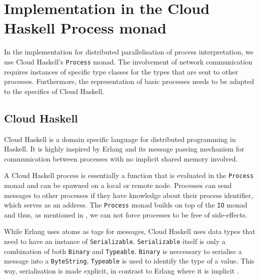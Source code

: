 \clearpage


\section{Implementation in the Cloud Haskell Process monad}
\label{chp:distributed}
In the implementation for distributed parallelisation of process interpretation, we use \textsf{Cloud Haskell}'s \texttt{Process} monad. The involvement of network communication requires instances of specific type classes for the types that are sent to other processes. Furthermore, the representation of basic processes needs to be adapted to the specifics of \textsf{Cloud Haskell}. 

\subsection{Cloud Haskell}
\label{chp:cloud_haskell}
\textsf{Cloud Haskell} \cite{Epstein:2011:THC:2034675.2034690} is a domain specific language for distributed programming in Haskell. It is highly inspired by Erlang and its message passing mechanism for communication between processes with no implicit shared memory involved.

A \textsf{Cloud Haskell} process is essentially a function that is evaluated in the \texttt{Process} monad and can be spawned on a local or remote node. Processes can send messages to other processes if they have knowledge about their process identifier, which serves as an address. The \texttt{Process} monad builds on top of the \texttt{IO} monad and thus, as mentioned in , we can not force processes to be free of side-effects.

While Erlang uses atoms as tags for messages, \textsf{Cloud Haskell} uses data types that need to have an instance of \texttt{Serializable}. \texttt{Serializable} itself is only a combination of both \texttt{Binary} and \texttt{Typeable}. \texttt{Binary} is neccessary to serialise a message into a \texttt{ByteString}, \texttt{Typeable} is used to identify the type of a value. This way, serialisation is made explicit, in contrast to Erlang where it is implicit \cite{Epstein:2011:THC:2034675.2034690}.

